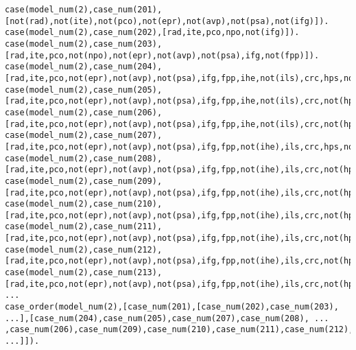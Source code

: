\documentclass{IOS-Book-Article}
\begin{document}
\begin{lstlisting}[caption={The Chinese copyright infringement case model in Prolog (selection)},captionpos=b,float]
case(model_num(2),case_num(201),[not(rad),not(ite),not(pco),not(epr),not(avp),not(psa),not(ifg)]).
case(model_num(2),case_num(202),[rad,ite,pco,npo,not(ifg)]).
case(model_num(2),case_num(203),[rad,ite,pco,not(npo),not(epr),not(avp),not(psa),ifg,not(fpp)]).
case(model_num(2),case_num(204),[rad,ite,pco,not(epr),not(avp),not(psa),ifg,fpp,ihe,not(ils),crc,hps,not(lps),not(m3fti),not(l3fti),not(cdt),not(fin)]).
case(model_num(2),case_num(205),[rad,ite,pco,not(epr),not(avp),not(psa),ifg,fpp,ihe,not(ils),crc,not(hps),lps,not(m3fti),not(l3fti),not(cdt),not(fin)]).
case(model_num(2),case_num(206),[rad,ite,pco,not(epr),not(avp),not(psa),ifg,fpp,ihe,not(ils),crc,not(hps),not(lps),m3fti,not(l3fti),not(cdt),fin]).
case(model_num(2),case_num(207),[rad,ite,pco,not(epr),not(avp),not(psa),ifg,fpp,not(ihe),ils,crc,hps,not(lps),not(m3fti),not(l3fti),not(cdt),not(fin)]).
case(model_num(2),case_num(208),[rad,ite,pco,not(epr),not(avp),not(psa),ifg,fpp,not(ihe),ils,crc,not(hps),lps,not(m3fti),not(l3fti),not(cdt),not(fin)]).
case(model_num(2),case_num(209),[rad,ite,pco,not(epr),not(avp),not(psa),ifg,fpp,not(ihe),ils,crc,not(hps),not(lps),not(m3fti),not(l3fti),not(cdt),fin]).
case(model_num(2),case_num(210),[rad,ite,pco,not(epr),not(avp),not(psa),ifg,fpp,not(ihe),ils,crc,not(hps),not(lps),not(m3fti),l3fti,not(cdt),fin,cpb,pbt]).
case(model_num(2),case_num(211),[rad,ite,pco,not(epr),not(avp),not(psa),ifg,fpp,not(ihe),ils,crc,not(hps),not(lps),not(m3fti),not(l3fti),cdt,fin,cpb,pbt]).
case(model_num(2),case_num(212),[rad,ite,pco,not(epr),not(avp),not(psa),ifg,fpp,not(ihe),ils,crc,not(hps),not(lps),not(m3fti),l3fti,not(cdt),fin,not(cpb),not(pbt)]).
case(model_num(2),case_num(213),[rad,ite,pco,not(epr),not(avp),not(psa),ifg,fpp,not(ihe),ils,crc,not(hps),not(lps),not(m3fti),not(l3fti),cdt,fin,not(cpb),not(pbt)]).
...
case_order(model_num(2),[case_num(201),[case_num(202),case_num(203), ...],[case_num(204),case_num(205),case_num(207),case_num(208), ... ,case_num(206),case_num(209),case_num(210),case_num(211),case_num(212),case_num(213), ...]]).
\end{lstlisting}

\begin{figure*}[b]
	\scalebox{0.7}{}
\caption{The Chinese copyright infringement model: argument structure (left); in Prolog (right)}
\label{fig:copyright}
\end{figure*}
\end{document}
